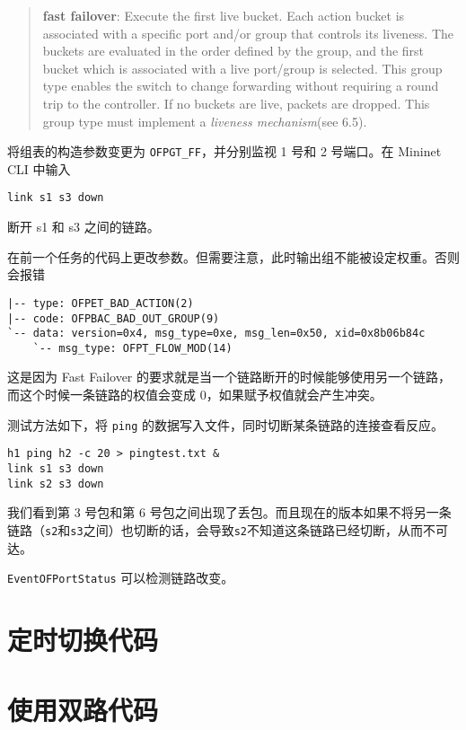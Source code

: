    \begin{quotation}
        \textbf{fast failover}: Execute the first live bucket. Each action bucket is associated with a specific
port and/or group that controls its liveness. The buckets are evaluated in the order defined by the
group, and the first bucket which is associated with a live port/group is selected. This group type
enables the switch to change forwarding without requiring a round trip to the controller. If no buckets
are live, packets are dropped. This group type must implement a \emph{liveness mechanism}(see 6.5).\cite{openflow13}
    \end{quotation}

    将组表的构造参数变更为 \verb"OFPGT_FF"，并分别监视 1 号和 2 号端口。在 Mininet CLI 中输入
    \begin{lstlisting}[style=commandshell]
    link s1 s3 down\end{lstlisting}
    断开 s1 和 s3 之间的链路\cite{mininetdown}。

    在前一个任务的代码上更改参数。但需要注意，此时输出组不能被设定权重。否则会报错
    \begin{verbatim}
|-- type: OFPET_BAD_ACTION(2)
|-- code: OFPBAC_BAD_OUT_GROUP(9)
`-- data: version=0x4, msg_type=0xe, msg_len=0x50, xid=0x8b06b84c
    `-- msg_type: OFPT_FLOW_MOD(14)       
    \end{verbatim}
    这是因为 Fast Failover 的要求就是当一个链路断开的时候能够使用另一个链路，而这个时候一条链路的权值会变成 0，如果赋予权值就会产生冲突。


    测试方法如下，将 \verb"ping" 的数据写入文件，同时切断某条链路的连接查看反应。
    \begin{lstlisting}[style=commandshell]
h1 ping h2 -c 20 > pingtest.txt &
link s1 s3 down
link s2 s3 down\end{lstlisting}


    我们看到第 3 号包和第 6 号包之间出现了丢包。而且现在的版本如果不将另一条链路（\verb"s2"和\verb"s3"之间）也切断的话，会导致\verb"s2"不知道这条链路已经切断，从而不可达。
    

    \verb"EventOFPortStatus" 可以检测链路改变。


    

    \appendix

    \section{定时切换代码}\label{sec:per5}


    \section{使用双路代码}\label{sec:balance}


